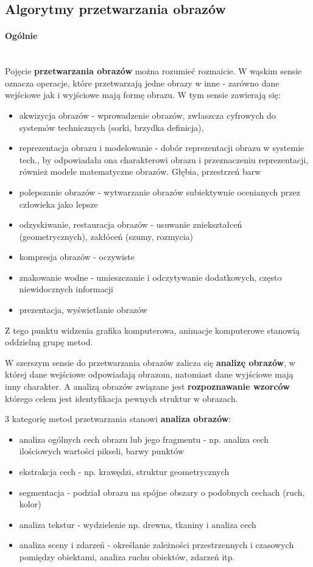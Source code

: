 \documentclass[]{report}
\begin{document}
\subsection{Algorytmy przetwarzania obrazów}
\paragraph{Ogólnie\\\\}
Pojęcie \textbf{przetwarzania obrazów} można rozumieć rozmaicie. W wąskim sensie oznacza operacje, które przetwarzają jedne obrazy w inne - zarówno dane wejściowe jak i wyjściowe mają formę obrazu. W tym sensie zawierają się:
\begin{itemize}
	\item akwizycja obrazów - wprowadzenie obrazów, zwłaszcza cyfrowych do systemów technicznych (sorki, brzydka definicja),
	\item reprezentacja obrazu i modelowanie - dobór reprezentacji obrazu w systemie tech., by odpowiadała ona charakterowi obrazu i przeznaczeniu reprezentacji, również modele matematyczne obrazów. Głębia, przestrzeń barw
	\item polepszanie obrazów - wytwarzanie obrazów subiektywnie ocenianych przez człowieka jako lepsze
	\item odzyskiwanie, restauracja obrazów - usuwanie zniekształceń (geometrycznych), zakłóceń (szumy, rozmycia)
	\item kompresja obrazów - oczywiste
	\item znakowanie wodne - umieszczanie i odczytywanie dodatkowych, często niewidocznych informacji
	\item prezentacja, wyświetlanie obrazów
\end{itemize}
	
	Z tego punktu widzenia grafika komputerowa, animacje komputerowe stanowią oddzielną grupę metod.
	
	W szerszym sensie do przetwarzania obrazów zalicza się \textbf{analizę obrazów}, w której dane wejściowe odpowiadają obrazom, natomiast dane wyjściowe mają inny charakter. A analizą obrazów związane jest \textbf{rozpoznawanie wzorców} którego celem jest identyfikacja pewnych struktur w obrazach.
	
	3 kategorię metod przetwarzania stanowi \textbf{analiza obrazów}:
\begin{itemize}
	\item analiza ogólnych cech obrazu lub jego fragmentu - np. analiza cech ilościowych wartości pikseli, barwy punktów
	\item ekstrakcja cech - np. krawędzi, struktur geometrycznych
	\item segmentacja - podział obrazu na spójne obszary o podobnych cechach (ruch, kolor)
	\item analiza tekstur - wydzielenie np. drewna, tkaniny i analiza cech
	\item analiza sceny i zdarzeń - określanie zależności przestrzennych i czasowych pomiędzy obiektami, analiza ruchu obiektów, zdarzeń itp.
\end{itemize}
\end{document}
